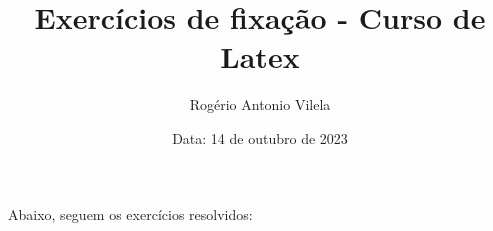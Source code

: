 \documentclass[a4paper, 12pt]{article}
\title{\textbf{Exercícios de fixação - Curso de Latex}}
\author{Rogério Antonio Vilela}
\date{Data: 14 de outubro de 2023}
\begin{document}
\maketitle

Abaixo, seguem os exercícios resolvidos:
\end{document}
